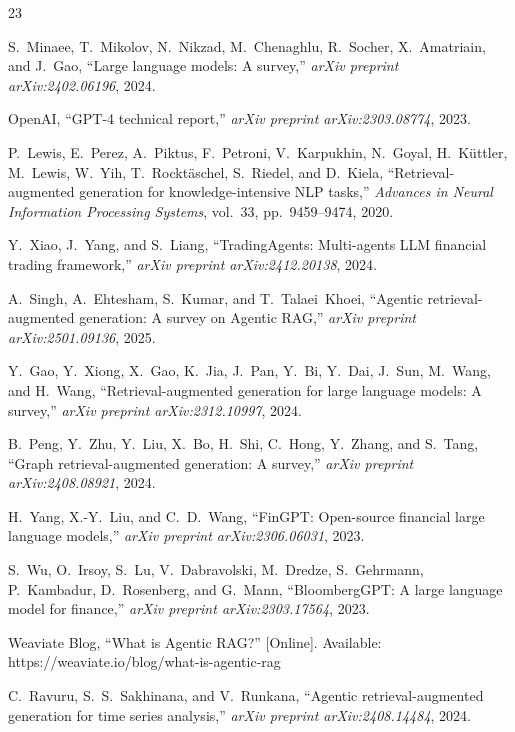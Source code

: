\documentclass[conference]{IEEEtran}
\begin{document}
\begin{thebibliography}{23}

S.~Minaee, T.~Mikolov, N.~Nikzad, M.~Chenaghlu, R.~Socher, X.~Amatriain, and J.~Gao, ``Large language models: A survey,'' \textit{arXiv preprint arXiv:2402.06196}, 2024.

OpenAI, ``GPT-4 technical report,'' \textit{arXiv preprint arXiv:2303.08774}, 2023.

P.~Lewis, E.~Perez, A.~Piktus, F.~Petroni, V.~Karpukhin, N.~Goyal, H.~K{\"u}ttler, M.~Lewis, W.~Yih, T.~Rockt{\"a}schel, S.~Riedel, and D.~Kiela, ``Retrieval-augmented generation for knowledge-intensive NLP tasks,'' \textit{Advances in Neural Information Processing Systems}, vol.~33, pp.~9459--9474, 2020.

Y.~Xiao, J.~Yang, and S.~Liang, ``TradingAgents: Multi-agents LLM financial trading framework,'' \textit{arXiv preprint arXiv:2412.20138}, 2024.

A.~Singh, A.~Ehtesham, S.~Kumar, and T.~Talaei~Khoei, ``Agentic retrieval-augmented generation: A survey on Agentic RAG,'' \textit{arXiv preprint arXiv:2501.09136}, 2025.

Y.~Gao, Y.~Xiong, X.~Gao, K.~Jia, J.~Pan, Y.~Bi, Y.~Dai, J.~Sun, M.~Wang, and H.~Wang, ``Retrieval-augmented generation for large language models: A survey,'' \textit{arXiv preprint arXiv:2312.10997}, 2024.

B.~Peng, Y.~Zhu, Y.~Liu, X.~Bo, H.~Shi, C.~Hong, Y.~Zhang, and S.~Tang, ``Graph retrieval-augmented generation: A survey,'' \textit{arXiv preprint arXiv:2408.08921}, 2024.

H.~Yang, X.-Y.~Liu, and C.~D.~Wang, ``FinGPT: Open-source financial large language models,'' \textit{arXiv preprint arXiv:2306.06031}, 2023.

S.~Wu, O.~Irsoy, S.~Lu, V.~Dabravolski, M.~Dredze, S.~Gehrmann, P.~Kambadur, D.~Rosenberg, and G.~Mann, ``BloombergGPT: A large language model for finance,'' \textit{arXiv preprint arXiv:2303.17564}, 2023.

Weaviate Blog, ``What is Agentic RAG?'' [Online]. Available: https://weaviate.io/blog/what-is-agentic-rag

C.~Ravuru, S.~S.~Sakhinana, and V.~Runkana, ``Agentic retrieval-augmented generation for time series analysis,'' \textit{arXiv preprint arXiv:2408.14484}, 2024.


\end{thebibliography}
\end{document}
